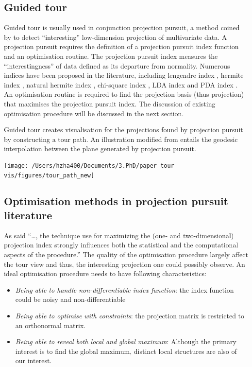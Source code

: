 \documentclass[12pt]{article}
\begin{document}
\hypertarget{guided-tour}{%
\subsection{Guided tour}\label{guided-tour}}

Guided tour is usually used in conjunction projection pursuit, a method
coined by \citet{friedman1974projection} to detect ``interesting''
low-dimension projection of multivariate data. A projection pursuit
requires the definition of a projection pursuit index function and an
optimisation routine. The projection pursuit index measures the
``interestingness'' of data defined as its departure from normality.
Numerous indices have been proposed in the literature, including
lengendre index \citep{friedman1974projection}, hermite index
\citep{hall1989polynomial}, natural hermite index
\citep{cook1993projection}, chi-square index
\citep{posse1995projection}, LDA index \citep{lee2005projection} and PDA
index \citep{lee2010projection}. An optimisation routine is required to
find the projection basis (thus projection) that maximises the
projection pursuit index. The discussion of existing optimisation
procedure will be discussed in the next section.

Guided tour creates visualisation for the projections found by
projection pursuit by constructing a tour path. An illustration modified
from \citep{buja2005computational} entails the geodesic interpolation
between the plane generated by projection pursuit.

\texttt{[image: /Users/hzha400/Documents/3.PhD/paper-tour-vis/figures/tour\_path\_new]}

\hypertarget{optimisation-methods-in-projection-pursuit-literature}{%
\subsection{Optimisation methods in projection pursuit
literature}\label{optimisation-methods-in-projection-pursuit-literature}}

As \citet{friedman1974projection} said ``\ldots{}, the technique use for
maximizing the (one- and two-dimensional) projection index strongly
influences both the statistical and the computational aspects of the
procedure.'' The quality of the optimisation procedure largely affect
the tour view and thus, the interesting projection one could possibly
observe. An ideal optimisation procedure needs to have following
characteristics:

\begin{itemize}
\item
  \emph{Being able to handle non-differentiable index function}: the
  index function could be noisy and non-differentiable
\item
  \emph{Being able to optimise with constraints}: the projection matrix
  is restricted to an orthonormal matrix.
\item
  \emph{Being able to reveal both local and global maximum}: Although
  the primary interest is to find the global maximum, distinct local
  structures are also of our interest.
\end{itemize}
\end{document}
